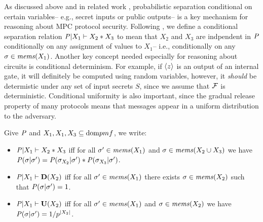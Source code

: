 As discussed above and in related work \cite{8429300}, probabilistic
separation conditional on certain variables-- e.g., secret inputs or
public outputs-- is a key mechanism for reasoning about MPC protocol
security. Following \cite{barthe2019probabilistic}, we define a
conditional separation relation $\mathit{P}|X_1 \vdash X_2 * X_3$ to
mean that $X_2$ and $X_3$ are indpendent in $\mathit{P}$ conditionally on
any assignment of values to $X_1$-- i.e., conditionally on any $\sigma
\in \mathit{mems}(X_1)$. Another key concept needed especially for reasoning
about circuits is conditional determinism. For example, if $\langle z \rangle$
is an output of an internal gate, it will definitely be computed using
random variables, however, it \emph{should} be determistic under any
set of input secrets $S$, since we assume that $\mathcal{F}$ is
deterministic. Conditional uniformity is also important, since the
gradual release property of many protocols means that messages appear
in a uniform distribution to the adversary.
\begin{definition} 
  Give $\mathit{P}$ and $X_1,X_1,X_3 \subseteq \mathrm{dom}{pmf}$, 
  we write:
  \begin{itemize}
  \item $\mathit{P}|X_1 \vdash X_2 * X_3$ iff for all
    $\sigma' \in \mathit{mems}(X_1)$ and $\sigma \in \mathit{mems}(X_2 \cup X_3)$ we have
    $\mathit{P}(\sigma|\sigma') = \mathit{P}(\sigma_{X_2}|\sigma') *  \mathit{P}(\sigma_{X_3}|\sigma')$.
  \item $\mathit{P}|X_1 \vdash \mathbf{D}(X_2)$ iff for all
    $\sigma' \in \mathit{mems}(X_1)$ there exists 
    $\sigma \in \mathit{mems}(X_2)$ such that $\mathit{P}(\sigma|\sigma') = 1$.
  \item $\mathit{P}|X_1 \vdash \mathbf{U}(X_2)$ iff for all
    $\sigma' \in \mathit{mems}(X_1)$ and
    $\sigma \in \mathit{mems}(X_2)$ we have
    $\mathit{P}(\sigma|\sigma') = 1/p^{|X_2|}$.
  \end{itemize}
\end{definition}

